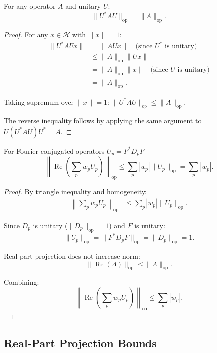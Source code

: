 \documentclass[11pt,a4paper]{article}
\begin{document}
\begin{proposition}
\label{prop:unitary-conjugation}
For any operator \(A\) and unitary \(U\):
\[
\|U^* A U\|_{\mathrm{op}} = \|A\|_{\mathrm{op}}.
\]
\end{proposition}

\begin{proof}
For any \(x \in \mathcal{H}\) with \(\|x\| = 1\):
\begin{align*}
\|U^* A U x\| 
&= \|A U x\| \quad \text{(since \(U^*\) is unitary)} \\
&\leq \|A\|_{\mathrm{op}} \|U x\| \\
&= \|A\|_{\mathrm{op}} \|x\| \quad \text{(since \(U\) is unitary)} \\
&= \|A\|_{\mathrm{op}}.
\end{align*}

Taking supremum over \(\|x\|=1\): \(\|U^* A U\|_{\mathrm{op}} \leq \|A\|_{\mathrm{op}}\).

The reverse inequality follows by applying the same argument to \(U(U^* A U)U^* = A\).
\end{proof}

\begin{proposition}
For Fourier-conjugated operators \(U_p = F^* D_p F\):
\[
\left\| \operatorname{Re}\left( \sum_p w_p U_p \right) \right\|_{\mathrm{op}} 
\leq \sum_p |w_p| \|U_p\|_{\mathrm{op}} = \sum_p |w_p|.
\]
\end{proposition}

\begin{proof}
By triangle inequality and homogeneity:
\begin{align*}
\left\| \sum_p w_p U_p \right\|_{\mathrm{op}} 
&\leq \sum_p |w_p| \|U_p\|_{\mathrm{op}}.
\end{align*}

Since \(D_p\) is unitary (\(\|D_p\|_{\mathrm{op}} = 1\)) and \(F\) is unitary:
\[
\|U_p\|_{\mathrm{op}} = \|F^* D_p F\|_{\mathrm{op}} = \|D_p\|_{\mathrm{op}} = 1.
\]

Real-part projection does not increase norm:
\[
\|\operatorname{Re}(A)\|_{\mathrm{op}} \leq \|A\|_{\mathrm{op}}.
\]

Combining:
\[
\left\| \operatorname{Re}\left( \sum_p w_p U_p \right) \right\|_{\mathrm{op}} 
\leq \sum_p |w_p|.
\]
\end{proof}

\subsection{Real-Part Projection Bounds}
\end{document}
